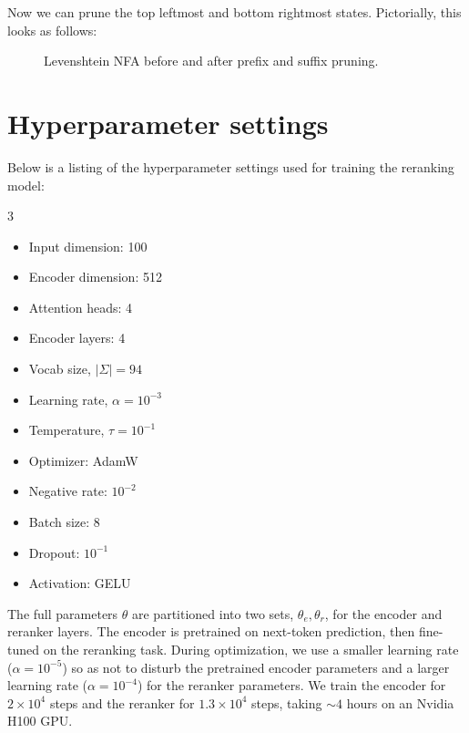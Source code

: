 \documentclass[sigplan,acmsmall,nonacm,screen]{acmart}\settopmatter{printfolios=false,printccs=false,printacmref=false}
\begin{document}
\noindent Now we can prune the top leftmost and bottom rightmost states. Pictorially, this looks as follows:

\begin{figure}[H]
  \resizebox{0.47\textwidth}{!}{
    
  }
  \resizebox{0.47\textwidth}{!}{
    
  }
  \caption{Levenshtein NFA before and after prefix and suffix pruning.}
\end{figure}\vspace{-0.175cm}

\section{Hyperparameter settings}\label{sec:hyperparams}

Below is a listing of the hyperparameter settings used for training the reranking model:

\begin{multicols}{3}
\begin{itemize}
\item Input dimension: 100
\item Encoder dimension: 512
\item Attention heads: 4
\item Encoder layers: 4
\item Vocab size, $|\Sigma|= 94$
\item Learning rate, $\alpha= 10^{-3}$
\item Temperature, $\tau= 10^{-1}$
\item Optimizer: AdamW
\item Negative rate: $10^{-2}$
\item Batch size: 8
\item Dropout: $10^{-1}$
\item Activation: GELU
\end{itemize}
\end{multicols}

The full parameters $\theta$ are partitioned into two sets, $\theta_e, \theta_r$, for the encoder and reranker layers. The encoder is pretrained on next-token prediction, then fine-tuned on the reranking task. During optimization, we use a smaller learning rate ($\alpha = 10^{-5}$) so as not to disturb the pretrained encoder parameters and a larger learning rate ($\alpha = 10^{-4}$) for the reranker parameters. We train the encoder for $2\times 10^4$ steps and the reranker for $1.3 \times 10^4$ steps, taking $\sim 4$ hours on an Nvidia H100 GPU.
\end{document}
